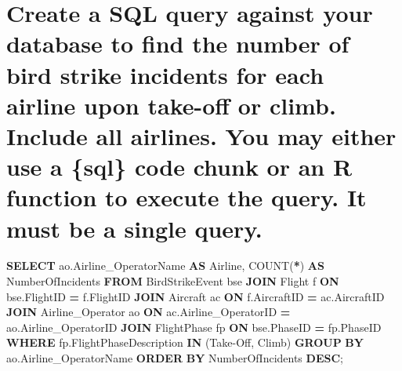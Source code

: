 \documentclass[
]{article}
\newenvironment{Shaded}{\begin{snugshade}}{\end{snugshade}}
\newcommand{\FunctionTok}[1]{\textcolor[rgb]{0.00,0.00,0.00}{#1}}
\newcommand{\KeywordTok}[1]{\textcolor[rgb]{0.13,0.29,0.53}{\textbf{#1}}}
\newcommand{\NormalTok}[1]{#1}
\newcommand{\OperatorTok}[1]{\textcolor[rgb]{0.81,0.36,0.00}{\textbf{#1}}}
\newcommand{\StringTok}[1]{\textcolor[rgb]{0.31,0.60,0.02}{#1}}
\begin{document}
\hypertarget{create-a-sql-query-against-your-database-to-find-the-number-of-bird-strike-incidents-for-each-airline-upon-take-off-or-climb.-include-all-airlines.-you-may-either-use-a-sql-code-chunk-or-an-r-function-to-execute-the-query.-it-must-be-a-single-query.}{%
\section{Create a SQL query against your database to find the number of
bird strike incidents for each airline upon take-off or climb. Include
all airlines. You may either use a \{sql\} code chunk or an R function
to execute the query. It must be a single
query.}\label{create-a-sql-query-against-your-database-to-find-the-number-of-bird-strike-incidents-for-each-airline-upon-take-off-or-climb.-include-all-airlines.-you-may-either-use-a-sql-code-chunk-or-an-r-function-to-execute-the-query.-it-must-be-a-single-query.}}

\begin{Shaded}
\begin{Highlighting}[]
\KeywordTok{SELECT} 
\NormalTok{    ao.Airline\_OperatorName }\KeywordTok{AS}\NormalTok{ Airline,}
    \FunctionTok{COUNT}\NormalTok{(}\OperatorTok{*}\NormalTok{) }\KeywordTok{AS}\NormalTok{ NumberOfIncidents}
\KeywordTok{FROM} 
\NormalTok{    BirdStrikeEvent bse}
\KeywordTok{JOIN} 
\NormalTok{    Flight f }\KeywordTok{ON}\NormalTok{ bse.FlightID }\OperatorTok{=}\NormalTok{ f.FlightID}
\KeywordTok{JOIN} 
\NormalTok{    Aircraft ac }\KeywordTok{ON}\NormalTok{ f.AircraftID }\OperatorTok{=}\NormalTok{ ac.AircraftID}
\KeywordTok{JOIN} 
\NormalTok{    Airline\_Operator ao }\KeywordTok{ON}\NormalTok{ ac.Airline\_OperatorID }\OperatorTok{=}\NormalTok{ ao.Airline\_OperatorID}
\KeywordTok{JOIN} 
\NormalTok{    FlightPhase fp }\KeywordTok{ON}\NormalTok{ bse.PhaseID }\OperatorTok{=}\NormalTok{ fp.PhaseID}
\KeywordTok{WHERE} 
\NormalTok{    fp.FlightPhaseDescription }\KeywordTok{IN}\NormalTok{ (}\StringTok{\textquotesingle{}Take{-}Off\textquotesingle{}}\NormalTok{, }\StringTok{\textquotesingle{}Climb\textquotesingle{}}\NormalTok{)}
\KeywordTok{GROUP} \KeywordTok{BY} 
\NormalTok{    ao.Airline\_OperatorName}
\KeywordTok{ORDER} \KeywordTok{BY} 
\NormalTok{    NumberOfIncidents }\KeywordTok{DESC}\NormalTok{;}
\end{Highlighting}
\end{Shaded}
\end{document}
